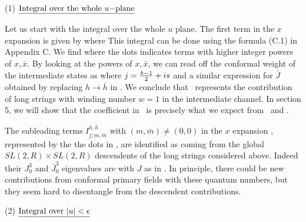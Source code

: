 \bigskip
\noindent
(1) $\underline{{\rm Integral~over~the~whole~}u{\rm -plane}}$
\bigskip

Let us start with the integral over the whole $u$ plane.
\eqn{}
The first term in the $x$ expansion is given by
\eqn{}
where
\eqn{}
This integral can be done using the formula (C.1) in Appendix C.
We  find
\eqn{}
where the dots indicates terms with higher integer powers of $x, \bar x$.
By looking at the powers of $x, \bar x $, we can read off the
 conformal weight of the intermediate states as
\eqn{}
where $j = {k-1 \over 2}  + is$ and a similar expression for $\bar J$ obtained
by replacing $h \to \bar h$ in \longstring .
We conclude that \whatrone\ represents the
contribution of  long strings with winding number $w=1$ in
the intermediate channel. In section 5, we will show
that the coefficient  in \whatrone\
 is precisely  what we expect from  \expan\  and \formofc .


The subleading terms $I_{j;m,\bar m}^{h,\bar h}$ with $(m,\bar m)
\not = (0,0) $
in the $x$ expansion \integral,
represented by the the dots in \whatrone ,
are identified as coming from the global $SL(2,R)\times SL(2,R)$
descendents of the long strings considered above.
Indeed their $J^3_0$ and $\bar J^3_0$
eigenvalues are
\eqn{}
with $J$ as in \longstring . In principle, there could be new
contributions from conformal primary fields with these quantum
numbers, but they seem hard  to disentangle
from the descendent contributions.


\bigskip
\noindent
(2) $\underline{{\rm Integral~over~}|u| < \epsilon}$
\bigskip

